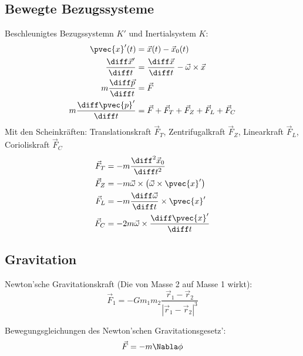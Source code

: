 \documentclass[11pt]{article}
\numberwithin{equation}{section}
\begin{document}
      \subsection{Bewegte Bezugssysteme}
        Beschleunigtes Bezugssystemn $K'$ und Inertialsystem $K$:
        \begin{equation}
          \begin{aligned}
            \pvec{x}'(t) &= \vec{x}(t)-\vec{x}_0(t) \\
            \tder{\vec{x}'}{t} &= \tder{\vec{x}}{t}-\vec{\omega}\times\vec{x} \\
            m\tder{\vec{p}}{t} &= \vec{F} \\
            m\tder{\pvec{p}'}{t} &= \vec{F} + \vec{F}_T + \vec{F}_Z + \vec{F}_L + \vec{F}_C \\
          \end{aligned}
        \end{equation}
        Mit den Scheinkräften: Translationskraft $\vec{F}_T$, Zentrifugalkraft $\vec{F}_Z$, Linearkraft $\vec{F}_L$, Corioliskraft $\vec{F}_C$
        \begin{equation}
          \begin{aligned}
            \vec{F}_T &= -m\frac{\diff^2 \vec{x}_0}{\diff t^2} \\
            \vec{F}_Z &= -m\vec{\omega}\times\Br{\vec{\omega}\times\pvec{x}'} \\
            \vec{F}_L &= -m\tder{\vec{\omega}}{t}\times\pvec{x}' \\
            \vec{F}_C &= -2m\vec{\omega}\times\tder{\pvec{x}'}{t} \\
          \end{aligned}
        \end{equation}


      \subsection{Gravitation}
        Newton'sche Gravitationskraft (Die von Masse 2 auf Masse 1 wirkt):
        \begin{equation}
          \vec{F}_1 = - G m_1 m_2 \frac{\vec{r}_1-\vec{r}_2}{\left|\vec{r}_1-\vec{r}_2\right|^3}
        \end{equation}

        Bewegungsgleichungen des Newton'schen Gravitationsgesetz':
        \begin{equation}
          \vec{F}=-m\Nabla\phi
        \end{equation}
\end{document}
